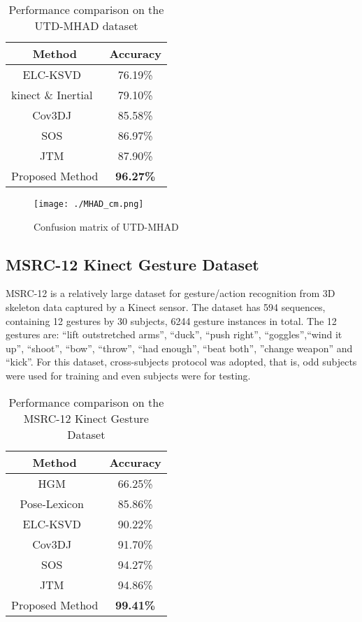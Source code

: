 \documentclass[10pt,journal]{IEEEtran}
\begin{document}
\begin{table}[htb]
\begin{center}
\caption{Performance comparison on the UTD-MHAD dataset \cite{Shahroudy2016NTU}} \label{tab:UTD-MHAD}
\begin{tabular}{  c  c }
\hline
Method              &Accuracy \\
\hline
ELC-KSVD~\cite{Zhou2014Discriminative} &76.19\%\\
kinect \& Inertial~\cite{Chen2015UTD} &79.10\%\\
Cov3DJ~\cite{Hussein2013Human}  &85.58\%\\
SOS~\cite{Hou2016Skeleton}  &86.97\%\\
JTM~\cite{Wang2016Action}& 87.90\%\\
Proposed Method     & \bf{96.27\%}\\
\hline
\end{tabular}
\end{center}
\end{table}


\begin{figure}[htb]
\centering
\texttt{[image: ./MHAD\_cm.png]}
\caption{Confusion matrix of UTD-MHAD}
\label{fig:map}
\end{figure}


\subsection{MSRC-12 Kinect Gesture Dataset}
MSRC-12 \cite{Fothergill2012Instructing} is a relatively large dataset for gesture/action
recognition from 3D skeleton data captured by a Kinect sensor. The dataset has 594 sequences, containing 12 gestures by 30 subjects, 6244 gesture instances in total. The 12 gestures are: “lift outstretched arms”, “duck”, “push right”, “goggles”,“wind it up”, “shoot”, “bow”, “throw”, “had enough”, “beat both”, ”change weapon” and “kick”. For this dataset, cross-subjects protocol was adopted, that is, odd subjects were used for training and even subjects were for testing.

\begin{table}[htb]
\begin{center}
\caption{Performance comparison on the MSRC-12 Kinect Gesture Dataset \cite{Shahroudy2016NTU}} \label{tab:MSRC-12}
\begin{tabular}{  c  c }
\hline
Method              &Accuracy \\
\hline
HGM~\cite{Yang2014A} &66.25\%\\
Pose-Lexicon~\cite{Zhou2016Learning} &85.86\%\\
ELC-KSVD~\cite{Zhou2014Discriminative} &90.22\%\\
Cov3DJ~\cite{Hussein2013Human}  &91.70\%\\
SOS~\cite{Hou2016Skeleton}  &94.27\%\\
JTM~\cite{Wang2016Action}& {94.86}\%\\
Proposed Method     & \bf{99.41\%}\\
\hline
\end{tabular}
\end{center}
\end{table}
\end{document}
